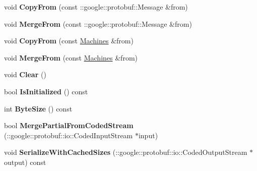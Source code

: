 \begin{DoxyCompactItemize}
\item 
\hypertarget{classmachines_1_1Machines_a605afb96d88f75e6523709744accd994}{void {\bfseries Copy\-From} (const \-::google\-::protobuf\-::\-Message \&from)}\label{classmachines_1_1Machines_a605afb96d88f75e6523709744accd994}

\item 
\hypertarget{classmachines_1_1Machines_aa103bcd18a11a4ae4b5006c41a6963bd}{void {\bfseries Merge\-From} (const \-::google\-::protobuf\-::\-Message \&from)}\label{classmachines_1_1Machines_aa103bcd18a11a4ae4b5006c41a6963bd}

\item 
\hypertarget{classmachines_1_1Machines_a695a058ef121a3602a4a725986c23f1e}{void {\bfseries Copy\-From} (const \hyperlink{classmachines_1_1Machines}{Machines} \&from)}\label{classmachines_1_1Machines_a695a058ef121a3602a4a725986c23f1e}

\item 
\hypertarget{classmachines_1_1Machines_a47fe6f7006872d1259bdbaef151c6eff}{void {\bfseries Merge\-From} (const \hyperlink{classmachines_1_1Machines}{Machines} \&from)}\label{classmachines_1_1Machines_a47fe6f7006872d1259bdbaef151c6eff}

\item 
\hypertarget{classmachines_1_1Machines_a762a75918a2ab568b3900eadb63a2866}{void {\bfseries Clear} ()}\label{classmachines_1_1Machines_a762a75918a2ab568b3900eadb63a2866}

\item 
\hypertarget{classmachines_1_1Machines_a46c08283129db4b3994306b6a64ee623}{bool {\bfseries Is\-Initialized} () const }\label{classmachines_1_1Machines_a46c08283129db4b3994306b6a64ee623}

\item 
\hypertarget{classmachines_1_1Machines_a75b8614e34090cdf79e1992a40f6ea6c}{int {\bfseries Byte\-Size} () const }\label{classmachines_1_1Machines_a75b8614e34090cdf79e1992a40f6ea6c}

\item 
\hypertarget{classmachines_1_1Machines_ad36cc5fe851a9bb2353bdeda8992268e}{bool {\bfseries Merge\-Partial\-From\-Coded\-Stream} (\-::google\-::protobuf\-::io\-::\-Coded\-Input\-Stream $\ast$input)}\label{classmachines_1_1Machines_ad36cc5fe851a9bb2353bdeda8992268e}

\item 
\hypertarget{classmachines_1_1Machines_a0e9d435e3d34ca4f8f38193c80d594fb}{void {\bfseries Serialize\-With\-Cached\-Sizes} (\-::google\-::protobuf\-::io\-::\-Coded\-Output\-Stream $\ast$output) const }\label{classmachines_1_1Machines_a0e9d435e3d34ca4f8f38193c80d594fb}


\end{DoxyCompactItemize}
